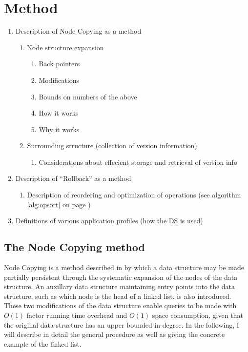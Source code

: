 \chapter{Method}

\begin{enumerate}   \item Description of Node Copying as a method
  \begin{enumerate}     \item Node structure expansion
    \begin{enumerate}       \item Back pointers
      \item Modifications \item Bounds on numbers of the above \item How it
      works \item Why it works     \end{enumerate}
    \item Surrounding structure (collection of version information)
    \begin{enumerate}       \item Considerations about effecient storage and
    retrieval of version info     \end{enumerate}
  \end{enumerate}
  \item Description of ``Rollback'' as a method \begin{enumerate}     \item
  Description of reordering and optimization of operations (see algorithm
  \ref{alg:opsort} on page \pageref{alg:opsort})
  \end{enumerate}
  \item Definitions of various application profiles (how the DS is used)
  \end{enumerate}

\section{The Node Copying method}
Node Copying is a method described in \cite{Driscoll198986} by which a data
structure may be made partially persistent through the systematic expansion of
the nodes of the data structure. An auxillary data structure maintaining entry
points into the data structure, such as which node is the head of a linked list,
is also introduced. These two modifications of the data structure enable queries
to be made with $O(1)$ factor running time overhead and $O(1)$ space
consumption, given that the original data structure has an upper bounded
in-degree. In the following, I will describe in detail the general procedure as
well as giving the concrete example of the linked list.

